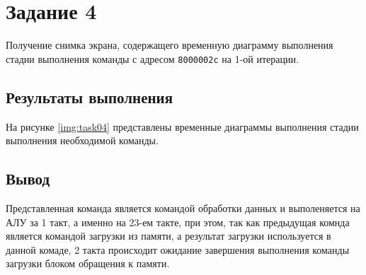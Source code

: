 \chapter{Задание 4}

Получение снимка экрана, содержащего временную диаграмму выполнения стадии
выполнения команды с адресом \texttt{8000002c} на 1-ой итерации.

\section{Результаты выполнения}

На рисунке \ref{img:task04} представлены временные диаграммы выполнения стадии
выполнения необходимой команды.


\section{Вывод}

Представленная команда является командой обработки данных и выполеняется на АЛУ
за 1 такт, а именно на 23-ем такте, при этом, так как предыдущая комнда
является командой загрузки из памяти, а результат загрузки используется в
данной комаде, 2 такта происходит ожидание завершения выполнения команды
загрузки блоком обращения к памяти.

